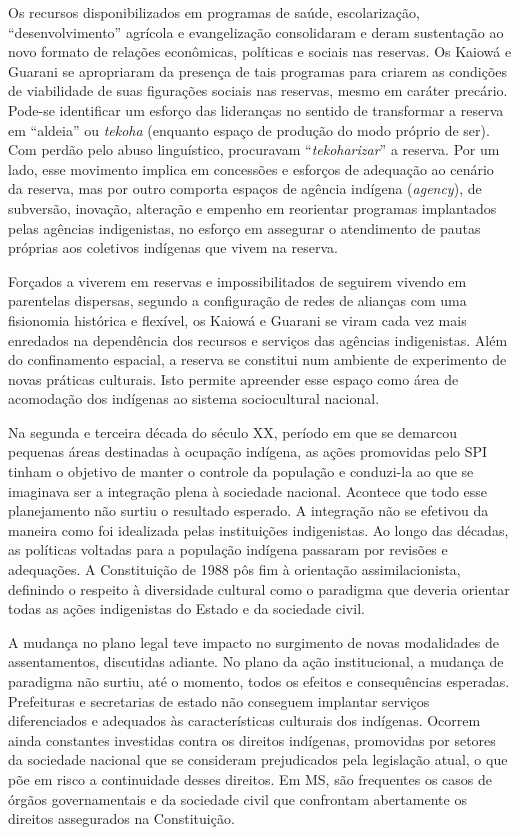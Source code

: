 Os recursos disponibilizados em programas de saúde, escolarização,
``desenvolvimento'' agrícola e evangelização consolidaram e deram
sustentação ao novo formato de relações econômicas, políticas e sociais
nas reservas. Os Kaiowá e Guarani se apropriaram da presença de tais
programas para criarem as condições de viabilidade de suas figurações
sociais nas reservas, mesmo em caráter precário. Pode-se identificar um
esforço das lideranças no sentido de transformar a reserva em ``aldeia''
ou \emph{tekoha} (enquanto espaço de produção do modo próprio de ser).
Com perdão pelo abuso linguístico, procuravam ``\emph{tekoharizar}'' a
reserva. Por um lado, esse movimento implica em concessões e esforços de
adequação ao cenário da reserva, mas por outro comporta espaços de
agência indígena (\emph{agency}), de subversão, inovação, alteração e
empenho em reorientar programas implantados pelas agências indigenistas,
no esforço em assegurar o atendimento de pautas próprias aos coletivos
indígenas que vivem na reserva.

Forçados a viverem em reservas e impossibilitados de seguirem vivendo em
parentelas dispersas, segundo a configuração de redes de alianças com
uma fisionomia histórica e flexível, os Kaiowá e Guarani se viram cada
vez mais enredados na dependência dos recursos e serviços das agências
indigenistas. Além do confinamento espacial, a reserva se constitui num
ambiente de experimento de novas práticas culturais. Isto permite
apreender esse espaço como área de acomodação dos indígenas ao sistema
sociocultural nacional.

Na segunda e terceira década do século XX, período em que se demarcou
pequenas áreas destinadas à ocupação indígena, as ações promovidas pelo
SPI tinham o objetivo de manter o controle da população e conduzi-la ao
que se imaginava ser a integração plena à sociedade nacional. Acontece
que todo esse planejamento não surtiu o resultado esperado. A integração
não se efetivou da maneira como foi idealizada pelas instituições
indigenistas. Ao longo das décadas, as políticas voltadas para a
população indígena passaram por revisões e adequações. A Constituição de
1988 pôs fim à orientação assimilacionista, definindo o respeito à
diversidade cultural como o paradigma que deveria orientar todas as
ações indigenistas do Estado e da sociedade civil.

A mudança no plano legal teve impacto no surgimento de novas modalidades
de assentamentos, discutidas adiante. No plano da ação institucional, a
mudança de paradigma não surtiu, até o momento, todos os efeitos e
consequências esperadas. Prefeituras e secretarias de estado não
conseguem implantar serviços diferenciados e adequados às
características culturais dos indígenas. Ocorrem ainda constantes
investidas contra os direitos indígenas, promovidas por setores da
sociedade nacional que se consideram prejudicados pela legislação atual,
o que põe em risco a continuidade desses direitos. Em MS, são frequentes
os casos de órgãos governamentais e da sociedade civil que confrontam
abertamente os direitos assegurados na Constituição.

